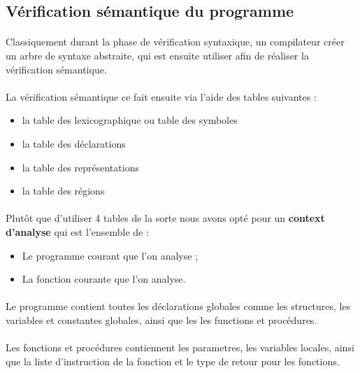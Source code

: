 \subsection{Vérification sémantique du programme}

\paragraph{}Classiquement durant la phase de vérification syntaxique, un 
compilateur créer un arbre de syntaxe abstraite, qui est ensuite utiliser afin 
de réaliser la vérification sémantique.

\paragraph{}La vérification sémantique ce fait ensuite via l'aide des tables 
suivantes :

\begin{itemize}
 \item la table des lexicographique ou table des symboles
 \item la table des déclarations
 \item la table des représentations
 \item la table des régions
\end{itemize}

\paragraph{}Plutôt que d'utiliser 4 tables de la sorte nous avons opté pour 
un \textbf{context d'analyse} qui est l'ensemble de :
\begin{itemize}
    \item Le programme courant que l'on analyse ;
    \item La fonction courante que l'on analyse.
\end{itemize}

\paragraph{}Le programme contient toutes les déclarations globales comme les 
structures, les variables et constantes globales, ainsi que les les functions 
et procédures.

\paragraph{}Les fonctions et procédures contiennent les parametres, les 
variables locales, ainsi que la liste d'instruction de la fonction et le type 
de retour pour les fonctions.

